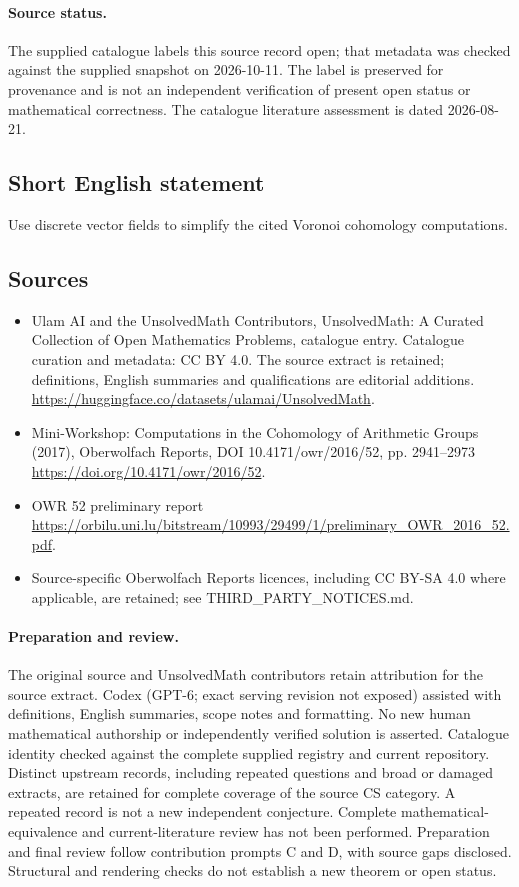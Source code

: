 \documentclass[11pt]{article}
\begin{document}
\paragraph{Source status.}
The supplied catalogue labels this source record open; that metadata was checked against the supplied snapshot on 2026-10-11. The label is preserved for provenance and is not an independent verification of present open status or mathematical correctness. The catalogue literature assessment is dated 2026-08-21.
\subsection{Short English statement}
Use discrete vector fields to simplify the cited Voronoi cohomology computations.
\subsection{Sources}
\begin{itemize}
\item[S1] Ulam AI and the UnsolvedMath Contributors, UnsolvedMath: A Curated Collection of Open Mathematics Problems, catalogue entry. Catalogue curation and metadata: CC BY 4.0. The source extract is retained; definitions, English summaries and qualifications are editorial additions.
\url{https://huggingface.co/datasets/ulamai/UnsolvedMath}.
\item[S2] Mini-Workshop: Computations in the Cohomology of Arithmetic Groups (2017), Oberwolfach Reports, DOI 10.4171/owr/2016/52, pp. 2941--2973
\url{https://doi.org/10.4171/owr/2016/52}.
\item[S3] OWR 52 preliminary report
\url{https://orbilu.uni.lu/bitstream/10993/29499/1/preliminary_OWR_2016_52.pdf}.
\item Source-specific Oberwolfach Reports licences, including CC BY-SA 4.0 where applicable, are retained; see THIRD\_PARTY\_NOTICES.md.
\end{itemize}
\paragraph{Preparation and review.}
The original source and UnsolvedMath contributors retain attribution for the source extract. Codex (GPT-6; exact serving revision not exposed) assisted with definitions, English summaries, scope notes and formatting. No new human mathematical authorship or independently verified solution is asserted. Catalogue identity checked against the complete supplied registry and current repository. Distinct upstream records, including repeated questions and broad or damaged extracts, are retained for complete coverage of the source CS category. A repeated record is not a new independent conjecture. Complete mathematical-equivalence and current-literature review has not been performed. Preparation and final review follow contribution prompts C and D, with source gaps disclosed. Structural and rendering checks do not establish a new theorem or open status.
\label{end:statement}
\end{document}
